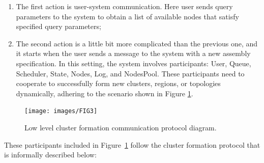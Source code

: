 \begin{enumerate}[start=1,label={(\bfseries \arabic*)}]
	\item The first action is user-system communication. Here user sends query parameters to the system to obtain a list of available nodes that satisfy specified query parameters;
	\item The second action is a little bit more complicated than the previous one, and it starts when the user sends a message to the system with a new assembly specification. In this setting, the system involves participants: User, Queue, Scheduler, State, Nodes, Log, and NodesPool. These participants need to cooperate to successfully form new clusters, regions, or topologies dynamically, adhering to the scenario shown in Figure \ref{fig:fig7}.
\end{enumerate} 

\begin{figure}[H]
	\begin{center}
		\texttt{[image: images/FIG3]}
	\end{center}
	\vspace{-0.7cm}
	\caption{Low level cluster formation communication protocol diagram.}
	\label{fig:fig7}
\end{figure}

\noindent
These participants included in Figure~\ref{fig:fig7} follow the cluster formation protocol that is informally described below:

